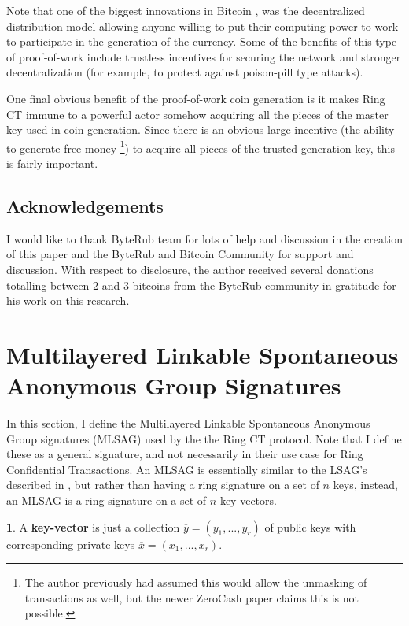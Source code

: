 \documentclass[12pt,oneside,english]{amsart}
\numberwithin{equation}{section}
\numberwithin{figure}{section}
\theoremstyle{plain}
\theoremstyle{plain}
\theoremstyle{remark}
\theoremstyle{plain}
\theoremstyle{remark}
\theoremstyle{remark}
\theoremstyle{plain}
\theoremstyle{definition}
\newtheorem{defn}[thm]{\protect\definitionname}
\providecommand{\definitionname}{Definition}
\begin{document}
Note that one of the biggest innovations in Bitcoin \cite{SN}, was
the decentralized distribution model allowing anyone willing to put
their computing power to work to participate in the generation of
the currency. Some of the benefits of this type of proof-of-work include
trustless incentives for securing the network and stronger decentralization (for example, to protect against poison-pill type attacks).  

One final obvious benefit of the proof-of-work coin generation is
it makes Ring CT immune to a powerful actor somehow acquiring all the
pieces of the master key used in coin generation. Since there is an
obvious large incentive (the ability to generate free money \footnote{The author previously had assumed this would allow the unmasking of transactions as well, but the newer ZeroCash paper claims this is not possible.}) to acquire all pieces of the trusted generation
key, this is fairly important. 


\subsection{Acknowledgements}

I would like to thank ByteRub team for lots of help and discussion
in the creation of this paper and the ByteRub and Bitcoin Community
for support and discussion. With respect to disclosure, the author received several donations totalling between 2 and 3 bitcoins from the ByteRub community in gratitude for his work on this research. 



\section{Multilayered Linkable
Spontaneous Anonymous Group Signatures}
\label{MLSAGsection}



In this section, I define the Multilayered Linkable Spontaneous Anonymous 
Group signatures (MLSAG) used by the the Ring CT protocol. Note that
I define these as a general signature, and not necessarily in their
use case for Ring Confidential Transactions. An MLSAG is essentially similar to
the LSAG's described in \cite{LWW}, but rather than having a ring
signature on a set of $n$ keys, instead, an MLSAG is a ring signature
on a set of $n$ key-vectors. 
\begin{defn}
\label{def:A-key-vector-is}A \textbf{key-vector} is just a collection
$\overline{y}=\left(y_{1},...,y_{r}\right)$ of public keys with corresponding
private keys $\overline{x}=\left(x_{1},...,x_{r}\right)$. 
\end{defn}
\end{document}
